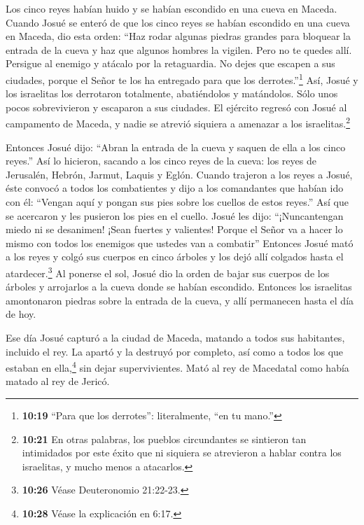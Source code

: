  Los cinco reyes habían huido y se habían escondido en una
cueva en Maceda.  Cuando Josué se enteró de que los cinco
reyes se habían escondido en una cueva en Maceda,  dio esta
orden: ``Haz rodar algunas piedras grandes para bloquear la entrada de
la cueva y haz que algunos hombres la vigilen.  Pero no te
quedes allí. Persigue al enemigo y atácalo por la retaguardia. No dejes
que escapen a sus ciudades, porque el Señor te los ha entregado para que
los derrotes.''\footnote{\textbf{10:19} ``Para que los derrotes'':
  literalmente, ``en tu mano.''}  Así, Josué y los
israelitas los derrotaron totalmente, abatiéndolos y matándolos. Sólo
unos pocos sobrevivieron y escaparon a sus ciudades.  El
ejército regresó con Josué al campamento de Maceda, y nadie se atrevió
siquiera a amenazar a los israelitas.\footnote{\textbf{10:21} En otras
  palabras, los pueblos circundantes se sintieron tan intimidados por
  este éxito que ni siquiera se atrevieron a hablar contra los
  israelitas, y mucho menos a atacarlos.}

 Entonces Josué dijo: ``Abran la entrada de la cueva y
saquen de ella a los cinco reyes.''  Así lo hicieron,
sacando a los cinco reyes de la cueva: los reyes de Jerusalén, Hebrón,
Jarmut, Laquis y Eglón.  Cuando trajeron a los reyes a
Josué, éste convocó a todos los combatientes y dijo a los comandantes
que habían ido con él: ``Vengan aquí y pongan sus pies sobre los cuellos
de estos reyes.'' Así que se acercaron y les pusieron los pies en el
cuello.  Josué les dijo: ``¡Nuncantengan miedo ni se
desanimen! ¡Sean fuertes y valientes! Porque el Señor va a hacer lo
mismo con todos los enemigos que ustedes van a combatir'' 
Entonces Josué mató a los reyes y colgó sus cuerpos en cinco árboles y
los dejó allí colgados hasta el atardecer.\footnote{\textbf{10:26} Véase
  Deuteronomio 21:22-23.}  Al ponerse el sol, Josué dio la
orden de bajar sus cuerpos de los árboles y arrojarlos a la cueva donde
se habían escondido. Entonces los israelitas amontonaron piedras sobre
la entrada de la cueva, y allí permanecen hasta el día de hoy.

 Ese día Josué capturó a la ciudad de Maceda, matando a
todos sus habitantes, incluido el rey. La apartó y la destruyó por
completo, así como a todos los que estaban en ella,\footnote{\textbf{10:28}
  Véase la explicación en 6:17.} sin dejar supervivientes. Mató al rey
de Macedatal como había matado al rey de Jericó.

